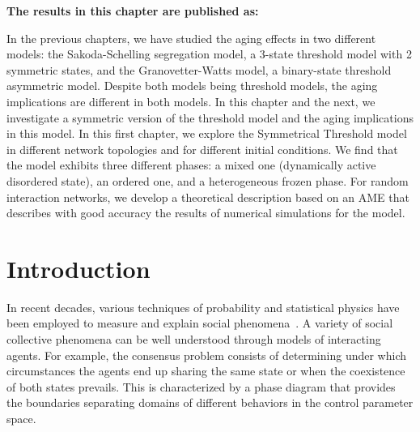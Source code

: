 \vspace{-1.5cm}
\small
\textbf{The results in this chapter are published as:}
\vspace{0.05 cm}

\normalsize
\vspace{0.5 cm}

In the previous chapters, we have studied the aging effects in two different models: the Sakoda-Schelling segregation model, a 3-state threshold model with 2 symmetric states, and the Granovetter-Watts model, a binary-state threshold asymmetric model. Despite both models being threshold models, the aging implications are different in both models. In this chapter and the next, we investigate a symmetric version of the threshold model and the aging implications in this model. In this first chapter, we explore the Symmetrical Threshold model in different network topologies and for different initial conditions. We find that the model exhibits three different phases: a mixed one (dynamically active disordered state), an ordered one, and a heterogeneous frozen phase. For random interaction networks, we develop a theoretical description based on an AME that describes with good accuracy the results of numerical simulations for the model.

\section{\label{sec:Introduction_Schelling} Introduction}

In recent decades, various techniques of probability and statistical physics have been employed to measure and explain social phenomena~\cite{castellano2009statistical,jusup2022social,bianconi2023complex}. A variety of social collective phenomena can be well understood through models of interacting agents. For example, the consensus problem consists of determining under which circumstances the agents end up sharing the same state or when the coexistence of both states prevails. This is characterized by a phase diagram that provides the boundaries separating domains of different behaviors in the control parameter space.

